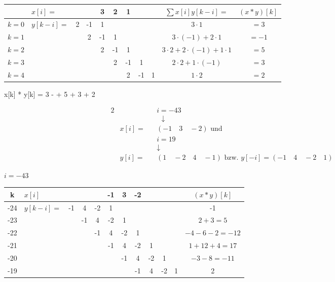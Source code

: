 \begin{tbox}
	\begin{tabular}{c | l c c c c c c c | c c}
		& $x[i] =$ & & &3 & 2 & 1 & & & $\sum x[i]y[k - i] =$ & $(x * y)[k]$\\\hline
		$ k = 0$ & $y[k - i] =$ & 2 & -1 & 1 & & & & & $3 \cdot 1$ & $= 3$\\
		$ k = 1$ & & & 2 & -1 & 1 & & & & $3 \cdot (-1) + 2 \cdot 1$ & $=-1$\\
		$ k = 2$ & & & & 2 & -1 & 1 &  & & $3 \cdot 2 + 2 \cdot (-1) + 1 \cdot 1$ & $=5$\\ 
		$ k = 3$ & & & & & 2 & -1 & 1 & & $2 \cdot 2 + 1 \cdot (-1)$ & $=3$\\
		$ k = 4$ & & & & & & 2 & -1 & 1 & $1 \cdot 2$ & $=2$\\
	\end{tabular}
\end{tbox}

\begin{abox}
	x[k] * y[k] = 3 \delta [k] - \delta [k - 1] + 5 \delta [k - 2] + 3 \delta [k - 3] + 2 \delta [k - 4]
\end{abox}

\begin{tbox}
	\begin{alignat*}{2}
	& &&i = -43\\
	& &&\text{ }\downarrow\\
	&x[i]= &&(-1\quad 3\quad -2) \text{ und}\\
	& &&i = 19\\
	& &&\downarrow\\
	& y[i]= &&(1\quad -2\quad 4\quad -1) \text{ bzw. } y[-i] = (-1\quad 4\quad -2\quad 1)
	\end{alignat*}	
\end{tbox}

\begin{tbox}
	$ i = -43$\\
	\begin{tabular}{c | l c c c c c c c c c | c}
		k & $x[i]$ & & & & -1 & 3 & -2  & & & & $(x * y)[k]$\\\hline
		-24 & $y[k - i] =$ & -1 & 4 & -2 & 1 & & & & & & -1\\
		-23 & & & -1 & 4 & -2 & 1 & & & & & $2 + 3 = 5$\\
		-22 & & & & -1 & 4 & -2 & 1 & & & & $-4-6-2 = -12$\\
		-21 & & & & & -1 & 4 & -2 & 1 & & & $1 + 12 + 4 = 17$\\
		-20 & & & & & & -1 & 4 & -2 & 1 & & $-3 - 8 = -11$\\
		-19 & & & & & & & -1 & 4 & -2 & 1 & 2\\
	\end{tabular}
\end{tbox}

